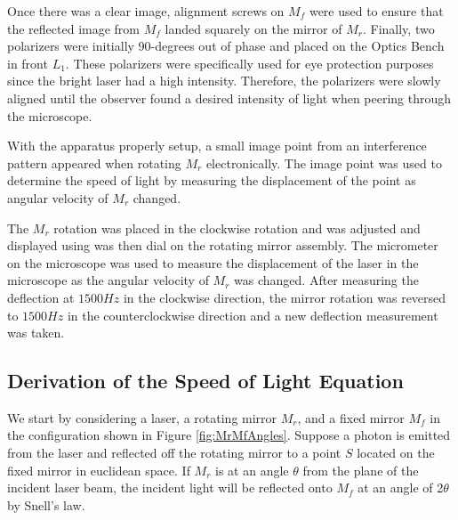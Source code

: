\documentclass[twocolumn]{article}
\begin{document}
		Once there was a clear image, alignment screws on $M_f$ were used to ensure that the reflected image from $M_f$ landed squarely on the mirror of $M_r$.
		Finally, two polarizers were initially 90-degrees out of phase and placed on the Optics Bench in front $L_1$.
		These polarizers were specifically used for eye protection purposes since the bright laser had a high intensity.  
		Therefore, the polarizers were slowly aligned until the observer found a desired intensity of light when peering through the microscope.
		
		With the apparatus properly setup, a small image point from an interference pattern appeared when rotating $M_r$ electronically.  
		The image point was used to determine the speed of light by measuring the displacement of the point as angular velocity of $M_r$ changed.
		
		The $M_r$ rotation was placed in the clockwise rotation and was adjusted and displayed using was then dial on the rotating mirror assembly. 
		The micrometer on the microscope was used to measure the displacement of the laser in the microscope as the angular velocity of $M_r$ was changed.  
		After measuring the deflection at $1500Hz$ in the clockwise direction, the mirror rotation was reversed to $1500Hz$ in the counterclockwise direction and a new deflection measurement was taken.
			
	\subsection{Derivation of the Speed of Light Equation}
	\label{subsec:Derivation}
	We start by considering a laser, a rotating mirror $M_r$, and a fixed mirror $M_f$ in the configuration shown in Figure \ref{fig:MrMfAngles}. 
	Suppose a photon is emitted from the laser and reflected off the rotating mirror to a point $S$ located on the fixed mirror in euclidean space. 
	If $M_r$ is at an angle $\theta$ from the plane of the incident laser beam, the incident light will be reflected onto $M_f$ at an angle of 2$\theta$ by Snell's law.
	
\end{document}
